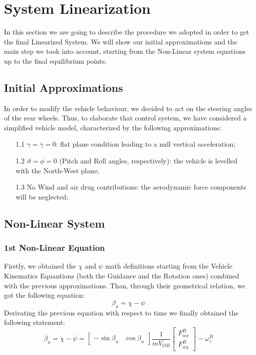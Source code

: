 \chapter{System Linearization}
	In this section we are going to describe the procedure we adopted in order to get the final Linearized System. We will show our initial approximations and the main step we took into account, starting from the Non-Linear system equations up to the final equilibrium points. 
\section{Initial Approximations} \label{approx}
	In order to modify the vehicle behaviour, we decided to act on the steering angles of the rear wheels. Thus, to elaborate that control system, we have considered a simplified vehicle model, characterized by the following approximations:
		\begin{itemize}
			\item[1.1] $ \gamma=\dot{\gamma}=0 $: flat plane condition leading to a null vertical acceleration;
			\item[1.2] $\vartheta = \phi = 0$ (Pitch and Roll angles, respectively): the vehicle is levelled with the North-West plane; 
			\item[1.3] No Wind and air drug contributions: the aerodynamic force components will be neglected;
		\end{itemize} 
\section{Non-Linear System}
\subsection{1st Non-Linear Equation} 	
	Firstly, we obtained the $\chi$ and $\psi$ math definitions starting from the Vehicle Kinematics Equantions (both the Guidance and the Rotation ones) combined with the previous approximations. Than, through their geometrical relation, we got the following equation:
		\begin{equation}
			\beta_{u} = \chi - \psi
		\end{equation}
	Derivating the previous equation with respect to time we finally obtained the following statement:
		\begin{equation} \label{Betaudot}
			\dot{\beta}_{u} = \dot\chi - \dot\psi = 
			\begin{bmatrix}
			- \sin\beta_{u} & \cos\beta_{u}
			\end{bmatrix}
			\frac{1}{mV_{OB}}
			\begin{bmatrix}
			F_{wx}^{B} \\ F_{wy}^{B}
			\end{bmatrix}
			-\omega_{z}^{B}
		\end{equation}
